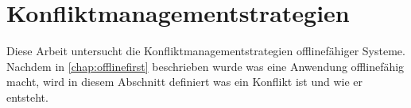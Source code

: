 %
%


%
%
\section{Konfliktmanagementstrategien}
Diese Arbeit untersucht die Konfliktmanagementstrategien offlinefähiger Systeme.
Nachdem in \autoref{chap:offlinefirst} beschrieben wurde was eine Anwendung offlinefähig macht, wird in diesem Abschnitt definiert was ein Konflikt ist und wie er entsteht.
%


